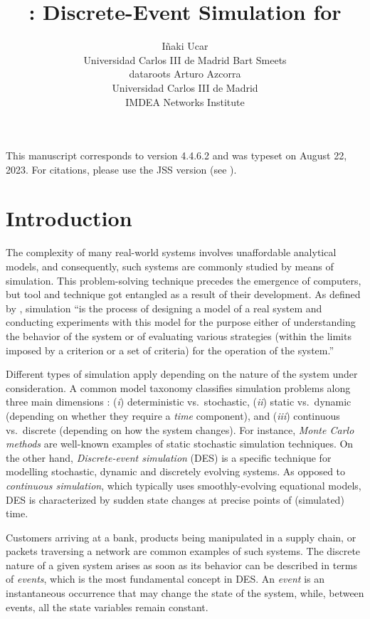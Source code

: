 \documentclass[
  nojss]{jss}
\author{
Iñaki Ucar\\Universidad Carlos III de Madrid \And Bart
Smeets\\dataroots \And Arturo Azcorra\\Universidad Carlos III de
Madrid\\
IMDEA Networks Institute
}
\title{\pkg{simmer}: Discrete-Event Simulation for \proglang{R}}
\begin{document}
\setlength{\abovedisplayskip}{0pt}

This manuscript corresponds to  version 4.4.6.2 and was
typeset on August 22, 2023. For citations, please use the JSS version
(see ).

\hypertarget{introduction}{%
\section{Introduction}\label{introduction}}

The complexity of many real-world systems involves unaffordable
analytical models, and consequently, such systems are commonly studied
by means of simulation. This problem-solving technique precedes the
emergence of computers, but tool and technique got entangled as a result
of their development. As defined by \citet{Shannon:1975:Systems},
simulation ``is the process of designing a model of a real system and
conducting experiments with this model for the purpose either of
understanding the behavior of the system or of evaluating various
strategies (within the limits imposed by a criterion or a set of
criteria) for the operation of the system.''

Different types of simulation apply depending on the nature of the
system under consideration. A common model taxonomy classifies
simulation problems along three main dimensions
\citep{Law:2000:Simulation}: (\emph{i}) deterministic vs.~stochastic,
(\emph{ii}) static vs.~dynamic (depending on whether they require a
\emph{time} component), and (\emph{iii}) continuous vs.~discrete
(depending on how the system changes). For instance, \emph{Monte Carlo
methods} are well-known examples of static stochastic simulation
techniques. On the other hand, \emph{Discrete-event simulation} (DES) is
a specific technique for modelling stochastic, dynamic and discretely
evolving systems. As opposed to \emph{continuous simulation}, which
typically uses smoothly-evolving equational models, DES is characterized
by sudden state changes at precise points of (simulated) time.

Customers arriving at a bank, products being manipulated in a supply
chain, or packets traversing a network are common examples of such
systems. The discrete nature of a given system arises as soon as its
behavior can be described in terms of \emph{events}, which is the most
fundamental concept in DES. An \emph{event} is an instantaneous
occurrence that may change the state of the system, while, between
events, all the state variables remain constant.
\end{document}
